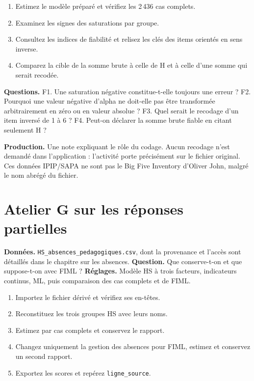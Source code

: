 \documentclass[
  french,
  11pt,
  a4paper,
  DIV=11,
  numbers=noendperiod]{scrreprt}
\providecommand{\tightlist}{%
  \setlength{\itemsep}{0pt}\setlength{\parskip}{0pt}}
\begin{document}
\begin{enumerate}
\def\labelenumi{\arabic{enumi}.}
\tightlist
\item
  Estimez le modèle préparé et vérifiez les 2\,436 cas complets.
\item
  Examinez les signes des saturations par groupe.
\item
  Consultez les indices de fiabilité et relisez les clés des items
  orientés en sens inverse.
\item
  Comparez la cible de la somme brute à celle de H et à celle d'une
  somme qui serait recodée.
\end{enumerate}

\textbf{Questions.} F1. Une saturation négative constitue-t-elle
toujours une erreur ? F2. Pourquoi une valeur négative d'alpha ne
doit-elle pas être transformée arbitrairement en zéro ou en valeur
absolue ? F3. Quel serait le recodage d'un item inversé de 1 à 6 ? F4.
Peut-on déclarer la somme brute fiable en citant seulement H ?

\textbf{Production.} Une note expliquant le rôle du codage. Aucun
recodage n'est demandé dans l'application : l'activité porte précisément
sur le fichier original. Ces données IPIP/SAPA ne sont pas le Big Five
Inventory d'Oliver John, malgré le nom abrégé du fichier.

\section{Atelier G sur les réponses
partielles}\label{atelier-g-sur-les-ruxe9ponses-partielles}

\textbf{Données.} \texttt{HS\_absences\_pedagogiques.csv}, dont la
provenance et l'accès sont détaillés dans le chapitre sur les absences.
\textbf{Question.} Que conserve-t-on et que suppose-t-on avec FIML ?
\textbf{Réglages.} Modèle HS à trois facteurs, indicateurs continus, ML,
puis comparaison des cas complets et de FIML.

\begin{enumerate}
\def\labelenumi{\arabic{enumi}.}
\tightlist
\item
  Importez le fichier dérivé et vérifiez ses en-têtes.
\item
  Reconstituez les trois groupes HS avec leurs noms.
\item
  Estimez par cas complets et conservez le rapport.
\item
  Changez uniquement la gestion des absences pour FIML, estimez et
  conservez un second rapport.
\item
  Exportez les scores et repérez \texttt{ligne\_source}.
\end{enumerate}
\end{document}
